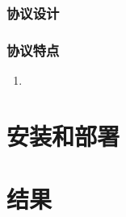 \documentclass[15pt]{ctexart}
\begin{document}
		\subsubsection{协议设计} %
		\label{ssub:协议设计}
			
		\subsubsection{协议特点} %
		\label{ssub:协议特点}
			\begin{enumerate}
				\item 
			\end{enumerate}
	


\section{安装和部署} %
\label{sec:安装和部署}


\section{结果} %
\label{sec:结果}
\end{document}
